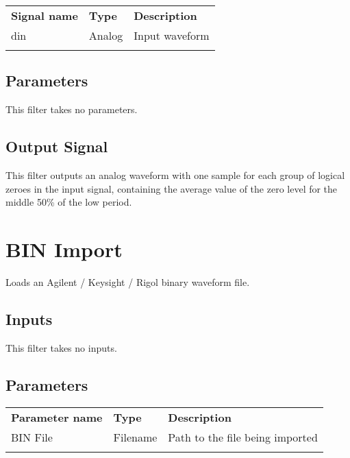 \begin{tabularx}{16cm}{llX}
\thickhline
\textbf{Signal name} & \textbf{Type} & \textbf{Description} \\
\thickhline
din & Analog & Input waveform \\
\thickhline
\end{tabularx}

\subsection{Parameters}

This filter takes no parameters.

\subsection{Output Signal}

This filter outputs an analog waveform with one sample for each group of logical zeroes in the input signal, containing
the average value of the zero level for the middle 50\% of the low period.

\pagebreak
\section{BIN Import}

Loads an Agilent / Keysight / Rigol binary waveform file.


\subsection{Inputs}

This filter takes no inputs.

\subsection{Parameters}

\begin{tabularx}{16cm}{llX}
\thickhline
\textbf{Parameter name} & \textbf{Type} & \textbf{Description} \\
\thickhline
BIN File & Filename & Path to the file being imported\\
\thickhline
\end{tabularx}

